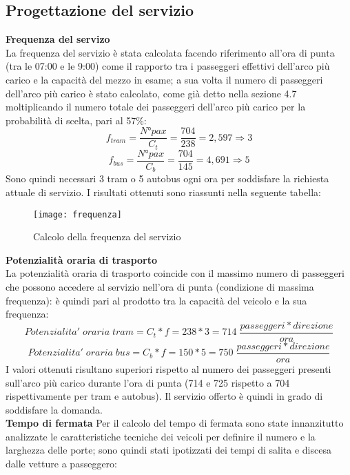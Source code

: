 \documentclass{article}
\begin{document}
\subsection{Progettazione del servizio}
\textbf{Frequenza del servizo}\\
La frequenza del servizio è stata calcolata facendo riferimento all’ora di punta (tra le 07:00 e le 9:00) come il rapporto tra i passeggeri effettivi dell’arco più carico e la capacità del mezzo in esame; a sua volta il numero di passeggeri dell’arco più carico è stato calcolato, come già detto nella sezione 4.7 moltiplicando il numero totale dei passeggeri dell’arco più carico per la probabilità di scelta, pari al 57\%: 
\begin{equation}
f_{tram}= \frac{N°pax}{C_t}=\frac{704}{238}=2,597 \Rightarrow 3
\end{equation}
\begin{equation}
f_{bus}=\frac{N°pax}{C_b}=\frac{704}{145}=4,691 \Rightarrow 5
\end{equation}
Sono quindi necessari 3 tram o 5 autobus ogni ora per soddisfare la richiesta attuale di servizio. I risultati ottenuti sono riassunti nella seguente tabella:
\begin{figure}[H]
\centering
\texttt{[image: frequenza]}
\caption{Calcolo della frequenza del servizio}
\end{figure}
\textbf{Potenzialità oraria di trasporto}\\
La potenzialità oraria di trasporto coincide con il massimo numero di passeggeri che possono accedere al servizio nell’ora di punta (condizione di massima frequenza): è quindi pari al prodotto tra la capacità del veicolo e la sua frequenza:
\begin{equation}
Potenzialita'\;oraria\;tram=C_t*f=238*3=714\;\frac{passeggeri*direzione}{ora}
\end{equation}
\begin{equation}
Potenzialita'\;oraria\;bus=C_b*f=150*5=750\;\frac{passeggeri*direzione}{ora}
\end{equation}
I valori ottenuti risultano superiori rispetto al numero dei passeggeri presenti sull’arco più carico durante l’ora di punta (714 e 725 rispetto a 704 rispettivamente per tram e autobus). Il servizio offerto è quindi in grado di soddisfare la domanda.\\
\textbf{Tempo di fermata}
Per il calcolo del tempo di fermata sono state innanzitutto analizzate le caratteristiche tecniche dei veicoli per definire il numero e la larghezza delle porte; sono quindi stati ipotizzati dei tempi di salita e discesa dalle vetture a passeggero: 
\end{document}
